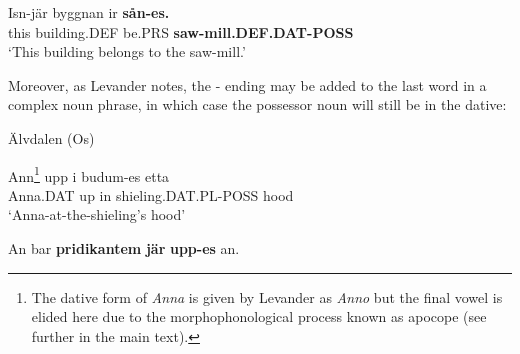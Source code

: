 
 \ea\label{}
\gll Isn-jär  byggnan  ir  \textbf{sån-es.}\\


this  building.DEF  be.PRS  \textbf{saw-mill.DEF.DAT-POSS}\\

\glt  ‘This building belongs to the saw-mill.’

\z

Moreover, as Levander notes, the \nobreakdash- ending may be added to the last word in a complex noun phrase, in which case the possessor noun will still be in the dative:


\item 

Älvdalen (Os)



\item 


 \ea\label{}
\gll Ann\footnote{ The dative form of \textit{Anna} is given by Levander as \textit{Anno} but the final vowel is elided here due to the morphophonological process known as apocope (see further in the main text).}  upp  i  budum-es   etta \\


Anna.DAT  up  in  shieling.DAT.PL-POSS  hood\\

\glt ‘Anna-at-the-shieling’s hood’ 

\z

\item 


 \ea\label{}
\gll An  bar  \textbf{pridikantem}\textbf{  jär}\textbf{  upp-es} an. \\


